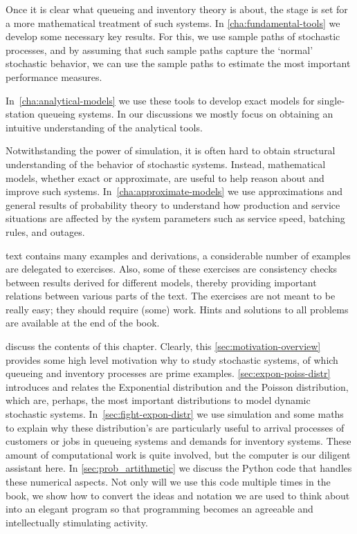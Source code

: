 \documentclass[stochastic-or.tex]{subfiles}
\begin{document}
Once it is clear what queueing and inventory theory is about, the stage is set for a more mathematical treatment of such systems.
In \cref{cha:fundamental-tools} we develop some necessary key results.
For this, we use sample paths of stochastic processes, and by assuming that such sample paths capture the `normal' stochastic behavior, we can use the sample paths to estimate the  most important performance measures.

In~\cref{cha:analytical-models} we use these tools to develop exact models for single-station queueing systems.
In our discussions we mostly focus on obtaining an intuitive understanding of the analytical tools.

Notwithstanding the power of simulation, it is often hard to obtain structural understanding of the behavior of stochastic systems.
Instead, mathematical models, whether exact or approximate, are useful to help reason about and improve such systems.
In~\cref{cha:approximate-models} we use approximations and general results of probability theory to understand how production and service situations are affected by the system parameters such as service speed, batching rules, and outages.


 text contains many examples and derivations, a considerable number of examples are delegated to exercises.
Also, some of these exercises are consistency checks between results derived for different models,  thereby providing important relations between various parts of the text.
The exercises are not meant to be really easy; they should require (some) work.
Hints and solutions to all problems are available at the end of the book.


 discuss the contents of this chapter.
Clearly, this \cref{sec:motivation-overview} provides some high level motivation why to study stochastic systems, of which queueing and inventory processes are prime examples.
\cref{sec:expon-poiss-distr} introduces and relates the Exponential distribution and the Poisson distribution, which are, perhaps, the most important distributions to model dynamic stochastic systems.
In~\cref{sec:fight-expon-distr} we use simulation and some maths to explain why these distribution's are particularly useful to arrival processes of customers or jobs in queueing systems and demands for inventory systems.
These amount of computational work is quite involved, but the computer is our diligent assistant here.
In \cref{sec:prob_artithmetic} we discuss the Python code that handles these numerical aspects.
Not only will we use this code multiple times in the book, we show how to convert the ideas and notation we are used to think about into an elegant program so that programming becomes an agreeable and intellectually stimulating activity.
\end{document}
